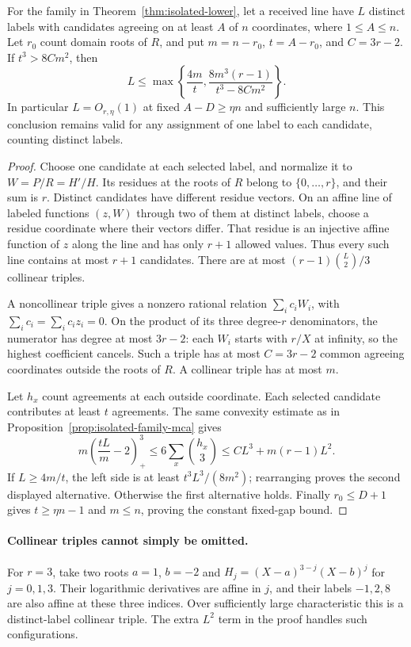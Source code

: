 \begin{proposition}
\label{prop:isolated-higher-agreement}
For the family in Theorem~\ref{thm:isolated-lower}, let a received line
have $L$ distinct labels with candidates agreeing on at least $A$
of $n$ coordinates, where $1\le A\le n$. Let $r_0$ count domain roots of $R$, and put
$m=n-r_0$, $t=A-r_0$, and $C=3r-2$. If $t^3>8Cm^2$, then
\[
 L\le\max\left\{\frac{4m}{t},
             \frac{8m^3(r-1)}{t^3-8Cm^2}\right\}.
\]
In particular $L=O_{r,\eta}(1)$ at fixed $A-D\ge\eta n$ and
sufficiently large $n$. This conclusion remains valid for any
assignment of one label to each candidate, counting distinct labels.
\end{proposition}
\begin{proof}
Choose one candidate at each selected label, and normalize it to
$W=P/R=H'/H$. Its residues at the roots of $R$ belong to
$\{0,\ldots,r\}$, and their sum is $r$. Distinct candidates have
different residue vectors. On an affine line of labeled functions
$(z,W)$ through two of them at distinct labels, choose a residue
coordinate where their vectors differ. That residue is an injective
affine function of $z$ along the line and has only $r+1$ allowed
values. Thus every such line contains at most $r+1$ candidates.
There are at most $(r-1)\binom L2/3$ collinear triples.

A noncollinear triple gives a nonzero rational relation
$\sum_i c_iW_i$, with $\sum_i c_i=\sum_i c_iz_i=0$.
On the product of its three degree-$r$ denominators, the numerator
has degree at most $3r-2$: each $W_i$ starts with $r/X$ at infinity,
so the highest coefficient cancels. Such a triple has at most
$C=3r-2$ common agreeing coordinates outside the roots of $R$.
A collinear triple has at most $m$.

Let $h_x$ count agreements at each outside coordinate. Each selected
candidate contributes at least $t$ agreements. The same convexity
estimate as in Proposition~\ref{prop:isolated-family-mca} gives
\[
 m\left(\frac{tL}{m}-2\right)_+^3
 \le6\sum_x\binom{h_x}{3}
 \le C L^3+m(r-1)L^2.
\]
If $L\ge4m/t$, the left side is at least $t^3L^3/(8m^2)$;
rearranging proves the second displayed alternative. Otherwise the
first alternative holds. Finally $r_0\le D+1$ gives
$t\ge\eta n-1$ and $m\le n$, proving the constant fixed-gap bound.
\end{proof}

\paragraph{Collinear triples cannot simply be omitted.}
For $r=3$, take two roots $a=1$, $b=-2$ and
$H_j=(X-a)^{3-j}(X-b)^j$ for $j=0,1,3$. Their logarithmic
derivatives are affine in $j$, and their labels $-1,2,8$ are also
affine at these three indices. Over sufficiently large characteristic
this is a distinct-label collinear triple. The extra $L^2$ term in
the proof handles such configurations.

